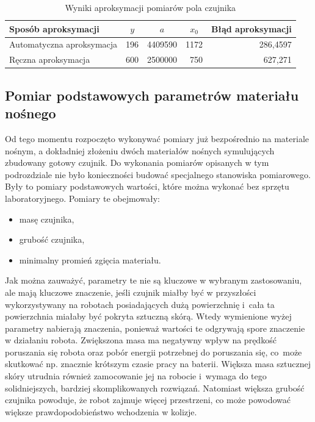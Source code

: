 \begin{table}[!h]
\centering
\caption{Wyniki aproksymacji pomiarów pola czujnika}
\begin{tabular}{|l|r|r|r|r|}
\hline
Sposób aproksymacji       & \multicolumn{1}{c|}{$y$} & \multicolumn{1}{c|}{$a$} & \multicolumn{1}{c|}{$x_0$} & \multicolumn{1}{l|}{Błąd aproksymacji} \\ \hline
Automatyczna aproksymacja & 196                    & 4409590                & 1172                   & 286,4597                               \\ \hline
Ręczna aproksymacja       & 600                    & 2500000                & 750                    & 627,271                                \\ \hline
\end{tabular}
\label{t_badanie_1_aproksymacja}
\end{table}

\subsection{Pomiar podstawowych parametrów materiału nośnego}

Od tego momentu rozpoczęto wykonywać pomiary już bezpośrednio na materiale nośnym, a dokładniej złożeniu dwóch materiałów nośnych symulujących zbudowany gotowy czujnik. Do wykonania pomiarów opisanych w tym podrozdziale nie było konieczności budować specjalnego stanowiska pomiarowego. Były to pomiary podstawowych wartości, które można wykonać bez sprzętu laboratoryjnego. Pomiary te obejmowały:
\begin{itemize}
    \item masę czujnika,
    \item grubość czujnika,
    \item minimalny promień zgięcia materiału.
\end{itemize}

Jak można zauważyć, parametry te nie są kluczowe w wybranym zastosowaniu, ale mają kluczowe znaczenie, jeśli czujnik miałby być w przyszłości wykorzystywany na robotach posiadających dużą powierzchnię i~cała ta powierzchnia miałaby być pokryta sztuczną skórą. Wtedy wymienione wyżej parametry nabierają znaczenia, ponieważ wartości te odgrywają spore znaczenie w działaniu robota. Zwiększona masa ma negatywny wpływ na prędkość poruszania się robota oraz pobór energii potrzebnej do poruszania się, co~może skutkować np. znacznie krótszym czasie pracy na baterii. Większa masa sztucznej skóry utrudnia również zamocowanie jej na robocie i~wymaga do tego solidniejszych, bardziej skomplikowanych rozwiązań. Natomiast większa grubość czujnika powoduje, że robot zajmuje więcej przestrzeni, co może powodować większe prawdopodobieństwo wchodzenia w kolizje.


